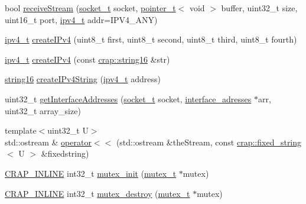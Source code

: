 \begin{DoxyCompactItemize}
\item 
bool \hyperlink{namespacecrap_a7461eb6fe54091937c8e3baa1537aa01}{receive\+Stream} (\hyperlink{namespacecrap_af06d7d92e9405fc0750f74417541c2be}{socket\+\_\+t} socket, \hyperlink{structcrap_1_1pointer__t}{pointer\+\_\+t}$<$ void $>$ buffer, uint32\+\_\+t size, uint16\+\_\+t port, \hyperlink{namespacecrap_a9ef32279067e77955c9f269926a331ee}{ipv4\+\_\+t} addr=I\+P\+V4\+\_\+\+A\+N\+Y)
\item 
\hyperlink{namespacecrap_a9ef32279067e77955c9f269926a331ee}{ipv4\+\_\+t} \hyperlink{namespacecrap_a53ce898b9a337508a0f471133173f64e}{create\+I\+Pv4} (uint8\+\_\+t first, uint8\+\_\+t second, uint8\+\_\+t third, uint8\+\_\+t fourth)
\item 
\hyperlink{namespacecrap_a9ef32279067e77955c9f269926a331ee}{ipv4\+\_\+t} \hyperlink{namespacecrap_a860138fe14ba38000fda323c4cf127cc}{create\+I\+Pv4} (const \hyperlink{namespacecrap_a6cff91a13d8be23072b3a0754c947caa}{crap\+::string16} \&str)
\item 
\hyperlink{namespacecrap_a6cff91a13d8be23072b3a0754c947caa}{string16} \hyperlink{namespacecrap_ae2b9113b9b7bb42e02d89a8304a0e55b}{create\+I\+Pv4\+String} (\hyperlink{namespacecrap_a9ef32279067e77955c9f269926a331ee}{ipv4\+\_\+t} address)
\item 
uint32\+\_\+t \hyperlink{namespacecrap_a0744060a6e6957ebd6831e2d55a4816a}{get\+Interface\+Addresses} (\hyperlink{namespacecrap_af06d7d92e9405fc0750f74417541c2be}{socket\+\_\+t} socket, \hyperlink{namespacecrap_af1dd6ce1461839e2d0d0b792fbd52e8a}{interface\+\_\+adresses} $\ast$arr, uint32\+\_\+t array\+\_\+size)
\item 
{\footnotesize template$<$uint32\+\_\+t U$>$ }\\std\+::ostream \& \hyperlink{namespacecrap_a52bcba1c4c4b793a7120e1a9850fb989}{operator$<$$<$} (std\+::ostream \&the\+Stream, const \hyperlink{classcrap_1_1fixed__string}{crap\+::fixed\+\_\+string}$<$ U $>$ \&fixedstring)
\item 
\hyperlink{config__x86_8h_a5a40526b8d842e7ff731509998bb0f1c}{C\+R\+A\+P\+\_\+\+I\+N\+L\+I\+N\+E} int32\+\_\+t \hyperlink{namespacecrap_a79e509cd35a5ed2084ecc7cda5d5a310}{mutex\+\_\+init} (\hyperlink{namespacecrap_a1a552340e5d6bb679ebde38c74a802a8}{mutex\+\_\+t} $\ast$mutex)
\item 
\hyperlink{config__x86_8h_a5a40526b8d842e7ff731509998bb0f1c}{C\+R\+A\+P\+\_\+\+I\+N\+L\+I\+N\+E} int32\+\_\+t \hyperlink{namespacecrap_aa79d8f90a94e95b1a58144e749ddf2b0}{mutex\+\_\+destroy} (\hyperlink{namespacecrap_a1a552340e5d6bb679ebde38c74a802a8}{mutex\+\_\+t} $\ast$mutex)

\end{DoxyCompactItemize}
